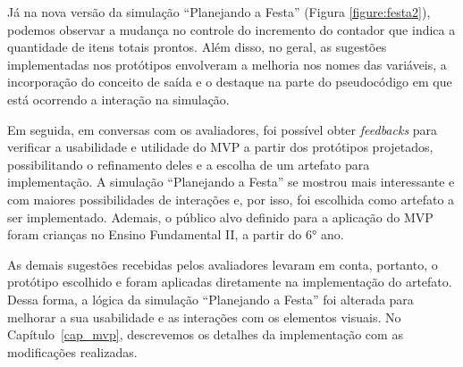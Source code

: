 Já na nova versão da simulação \enquote{Planejando a Festa} (Figura \ref{figure:festa2}), podemos observar a mudança no controle do incremento do contador que indica a quantidade de itens totais prontos. Além disso, no geral, as sugestões implementadas nos protótipos envolveram a melhoria nos nomes das variáveis, a incorporação do conceito de saída e o destaque na parte do pseudocódigo em que está ocorrendo a interação na simulação.

Em seguida, em conversas com os avaliadores, foi possível obter \textit{feedbacks} para verificar a usabilidade e utilidade do MVP a partir dos protótipos projetados, possibilitando o refinamento deles e a escolha de um artefato para implementação. A simulação \enquote{Planejando a Festa} se mostrou mais interessante e com maiores possibilidades de interações e, por isso, foi escolhida como artefato a ser implementado. Ademais, o público alvo definido para a aplicação do MVP foram crianças no Ensino Fundamental II, a partir do 6° ano.

As demais sugestões recebidas pelos avaliadores levaram em conta, portanto, o protótipo escolhido e foram aplicadas diretamente na implementação do artefato. Dessa forma, a lógica da simulação \enquote{Planejando a Festa} foi alterada para melhorar a sua usabilidade e as interações com os elementos visuais. No Capítulo~\ref{cap_mvp}, descrevemos os detalhes da implementação com as modificações realizadas.
